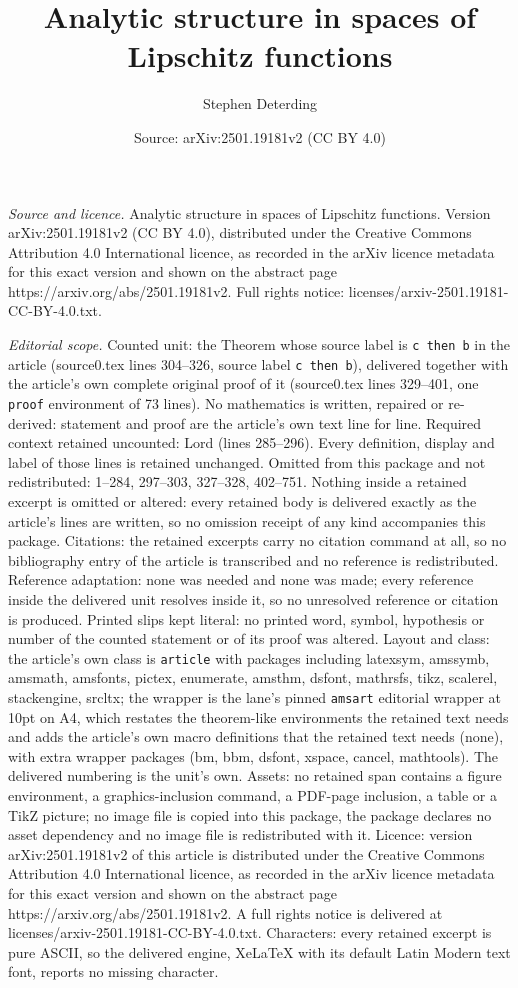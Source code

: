 \documentclass[10pt,a4paper]{amsart}
\title[Analytic structure in spaces of Lipschitz functions]{Analytic structure in spaces of Lipschitz functions}
\author{Stephen Deterding}
\date{Source: arXiv:2501.19181v2 (CC BY 4.0)}
\begin{document}
\maketitle

\noindent\emph{Source and licence.} Analytic structure in spaces of Lipschitz functions. Version arXiv:2501.19181v2 (CC BY 4.0), distributed under the Creative Commons Attribution 4.0 International licence, as recorded in the arXiv licence metadata for this exact version and shown on the abstract page https://arxiv.org/abs/2501.19181v2. Full rights notice: licenses/arxiv-2501.19181-CC-BY-4.0.txt.\par\smallskip

\noindent\textit{Editorial scope.} Counted unit: the Theorem whose source label is \texttt{c then b} in the article (source0.tex lines 304--326, source label \texttt{c then b}), delivered together with the article's own complete original proof of it (source0.tex lines 329--401, one \texttt{proof} environment of 73 lines). No mathematics is written, repaired or re-derived: statement and proof are the article's own text line for line. Required context retained uncounted: Lord (lines 285--296). Every definition, display and label of those lines is retained unchanged. Omitted from this package and not redistributed: 1--284, 297--303, 327--328, 402--751. Nothing inside a retained excerpt is omitted or altered: every retained body is delivered exactly as the article's lines are written, so no omission receipt of any kind accompanies this package. Citations: the retained excerpts carry no citation command at all, so no bibliography entry of the article is transcribed and no reference is redistributed. Reference adaptation: none was needed and none was made; every reference inside the delivered unit resolves inside it, so no unresolved reference or citation is produced. Printed slips kept literal: no printed word, symbol, hypothesis or number of the counted statement or of its proof was altered. Layout and class: the article's own class is \texttt{article} with packages including latexsym, amssymb, amsmath, amsfonts, pictex, enumerate, amsthm, dsfont, mathrsfs, tikz, scalerel, stackengine, srcltx; the wrapper is the lane's pinned \texttt{amsart} editorial wrapper at 10pt on A4, which restates the theorem-like environments the retained text needs and adds the article's own macro definitions that the retained text needs (none), with extra wrapper packages (bm, bbm, dsfont, xspace, cancel, mathtools). The delivered numbering is the unit's own. Assets: no retained span contains a figure environment, a graphics-inclusion command, a PDF-page inclusion, a table or a TikZ picture; no image file is copied into this package, the package declares no asset dependency and no image file is redistributed with it. Licence: version arXiv:2501.19181v2 of this article is distributed under the Creative Commons Attribution 4.0 International licence, as recorded in the arXiv licence metadata for this exact version and shown on the abstract page https://arxiv.org/abs/2501.19181v2. A full rights notice is delivered at licenses/arxiv-2501.19181-CC-BY-4.0.txt. Characters: every retained excerpt is pure ASCII, so the delivered engine, XeLaTeX with its default Latin Modern text font, reports no missing character.
\end{document}
